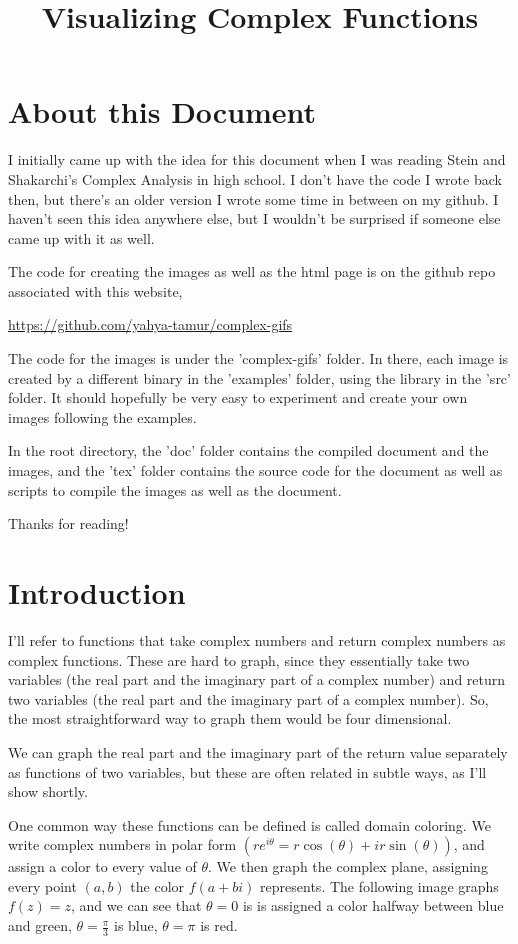 \documentclass[xhtml, mathjax]{article}
\title{Visualizing Complex Functions}
\author{}
\date{}
\begin{document}
  \EndCssFile


  \section{About this Document}

    I initially came up with the idea for this document when I was reading Stein
    and Shakarchi's Complex Analysis in high school. I don't have the code I
    wrote back then, but there's an older version I wrote some time in between
    on my github. I haven't seen this idea anywhere else, but I wouldn't be
    surprised if someone else came up with it as well.

    The code for creating the images as well as the html page is on the github
    repo associated with this website,

    \url{https://github.com/yahya-tamur/complex-gifs}

    The code for the images is under the 'complex-gifs' folder. In there, each
    image is created by a different binary in the 'examples' folder, using the
    library in the 'src' folder. It should hopefully be very easy to experiment
    and create your own images following the examples.

    In the root directory, the 'doc' folder contains the compiled document and
    the images, and the 'tex' folder contains the source code for the document
    as well as scripts to compile the images as well as the document.

    Thanks for reading!

  \section{Introduction}

    I'll refer to functions that take complex numbers and return complex numbers
    as complex functions. These are hard to graph, since they essentially take
    two variables (the real part and the imaginary part of a complex number) and
    return two variables (the real part and the imaginary part of a complex
    number). So, the most straightforward way to graph them would be four
    dimensional.

    We can graph the real part and the imaginary part of the return value
    separately as functions of two variables, but these are often related in
    subtle ways, as I'll show shortly.

    One common way these functions can be defined is called domain coloring. We
    write complex numbers in polar form $(re^{i\theta} = r\cos(\theta) +
    ir\sin(\theta))$, and assign a color to every value of $\theta$. We then
    graph the complex plane, assigning every point $(a,b)$ the color $f(a + bi)$
    represents. The following image graphs $f(z) = z$, and we can see that
    $\theta = 0$ is is assigned a color halfway between blue and green, $\theta
    = \frac{\pi}{3}$ is blue, $\theta = \pi$ is red.
\end{document}
